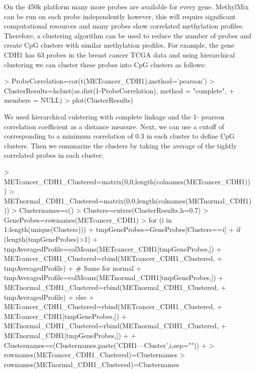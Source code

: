 \documentclass[11pt]{article}
\begin{document}
On the 450k platform many more probes are available for every gene. MethylMix 
can be run on each probe independently however, this will require significant 
computational resources and many probes show correlated methylation profiles. 
Therefore, a clustering algorithm can be used to reduce the number of probes and 
create CpG clusters with similar methylation profiles. For example, the gene 
CDH1 has 63 probes in the breast cancer TCGA data and using hierarchical 
clustering we can cluster these probes into CpG clusters as follows:

\begin{Schunk}
\begin{Sinput}
> ProbeCorrelation=cor(t(METcancer_CDH1),method='pearson')
> ClusterResults=hclust(as.dist(1-ProbeCorrelation), method = "complete", 
+                       members = NULL)
> plot(ClusterResults)
\end{Sinput}
\end{Schunk}

We used hierarchical culstering with complete linkage and the 1- pearson 
correlation coefficient as a distance measure. Next, we can use a cutoff of 
corresponding to a minimum correlation of 0.3 in each cluster to define CpG 
clusters. Then we summarize the clusters by taking the average of the tightly 
correlated probes in each cluster:

\begin{Schunk}
\begin{Sinput}
> METcancer_CDH1_Clustered=matrix(0,0,length(colnames(METcancer_CDH1)))
> METnormal_CDH1_Clustered=matrix(0,0,length(colnames(METnormal_CDH1)))
> Clusternames=c()
> Clusters=cutree(ClusterResults,h=0.7)
> GeneProbes=rownames(METcancer_CDH1)
> for (i in 1:length(unique(Clusters))) {
+      tmpGeneProbes=GeneProbes[Clusters==i]
+      if (length(tmpGeneProbes)>1) {
+           tmpAveragedProfile=colMeans(METcancer_CDH1[tmpGeneProbes,])
+           METcancer_CDH1_Clustered=rbind(METcancer_CDH1_Clustered,
+                                          tmpAveragedProfile)          
+           # Same for normal
+           tmpAveragedProfile=colMeans(METnormal_CDH1[tmpGeneProbes,])
+           METnormal_CDH1_Clustered=rbind(METnormal_CDH1_Clustered,
+                                          tmpAveragedProfile)
+      } else {          
+           METcancer_CDH1_Clustered=rbind(METcancer_CDH1_Clustered,
+                                          METcancer_CDH1[tmpGeneProbes,])
+           METnormal_CDH1_Clustered=rbind(METnormal_CDH1_Clustered,
+                                          METnormal_CDH1[tmpGeneProbes,])
+      }
+      Clusternames=c(Clusternames,paste('CDH1---Cluster',i,sep=""))
+ }
> rownames(METcancer_CDH1_Clustered)=Clusternames
> rownames(METnormal_CDH1_Clustered)=Clusternames
\end{Sinput}
\end{Schunk}
\end{document}
